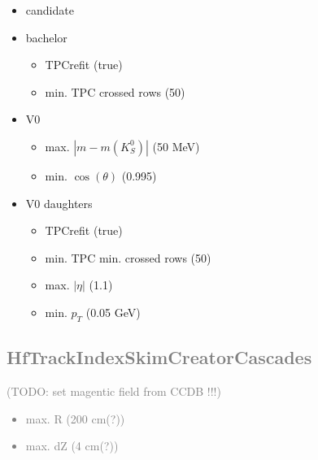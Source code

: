 \documentclass[a4paper,10pt]{article}
\begin{document}
\begin{itemize}
 \item candidate
 \item bachelor
 \begin{itemize}
 \item TPCrefit (true)
 \item min. TPC crossed rows (50)
 \end{itemize}
 \item V0
 \begin{itemize}
 \item max. $|m - m(K_S^0)|$ (50 MeV)
 \item min. $\cos(\theta)$ (0.995)
 \end{itemize}
 \item V0 daughters
  \begin{itemize}
 \item TPCrefit (true)
 \item min. TPC min. crossed rows (50)
 \item max. $|\eta|$ (1.1)
 \item min. $p_T$ (0.05 GeV)
 \end{itemize}
\end{itemize}
\textcolor{gray}{
\section{HfTrackIndexSkimCreatorCascades}
(TODO: set magentic field from CCDB !!!)
\begin{itemize}
  \item max. R (200 cm(?))
  \item max. dZ (4 cm(?))
\end{itemize}
}
\end{document}

